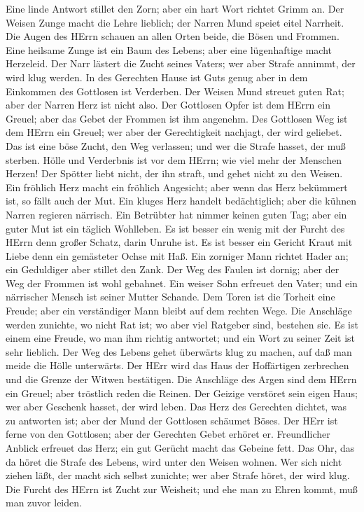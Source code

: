  Eine linde Antwort stillet den Zorn; aber ein hart Wort
richtet Grimm an.  Der Weisen Zunge macht die Lehre
lieblich; der Narren Mund speiet eitel Narrheit.  Die Augen
des HErrn schauen an allen Orten beide, die Bösen und Frommen.
 Eine heilsame Zunge ist ein Baum des Lebens; aber eine
lügenhaftige macht Herzeleid.  Der Narr lästert die Zucht
seines Vaters; wer aber Strafe annimmt, der wird klug werden.
 In des Gerechten Hause ist Guts genug aber in dem Einkommen
des Gottlosen ist Verderben.  Der Weisen Mund streuet guten
Rat; aber der Narren Herz ist nicht also.  Der Gottlosen
Opfer ist dem HErrn ein Greuel; aber das Gebet der Frommen ist ihm
angenehm.  Des Gottlosen Weg ist dem HErrn ein Greuel; wer
aber der Gerechtigkeit nachjagt, der wird geliebet.  Das
ist eine böse Zucht, den Weg verlassen; und wer die Strafe hasset, der
muß sterben.  Hölle und Verderbnis ist vor dem HErrn; wie
viel mehr der Menschen Herzen!  Der Spötter liebt nicht,
der ihn straft, und gehet nicht zu den Weisen.  Ein
fröhlich Herz macht ein fröhlich Angesicht; aber wenn das Herz bekümmert
ist, so fällt auch der Mut.  Ein kluges Herz handelt
bedächtiglich; aber die kühnen Narren regieren närrisch. 
Ein Betrübter hat nimmer keinen guten Tag; aber ein guter Mut ist ein
täglich Wohlleben.  Es ist besser ein wenig mit der Furcht
des HErrn denn großer Schatz, darin Unruhe ist.  Es ist
besser ein Gericht Kraut mit Liebe denn ein gemästeter Ochse mit Haß.
 Ein zorniger Mann richtet Hader an; ein Geduldiger aber
stillet den Zank.  Der Weg des Faulen ist dornig; aber der
Weg der Frommen ist wohl gebahnet.  Ein weiser Sohn
erfreuet den Vater; und ein närrischer Mensch ist seiner Mutter Schande.
 Dem Toren ist die Torheit eine Freude; aber ein
verständiger Mann bleibt auf dem rechten Wege.  Die
Anschläge werden zunichte, wo nicht Rat ist; wo aber viel Ratgeber sind,
bestehen sie.  Es ist einem eine Freude, wo man ihm richtig
antwortet; und ein Wort zu seiner Zeit ist sehr lieblich. 
Der Weg des Lebens gehet überwärts klug zu machen, auf daß man meide die
Hölle unterwärts.  Der HErr wird das Haus der Hoffärtigen
zerbrechen und die Grenze der Witwen bestätigen.  Die
Anschläge des Argen sind dem HErrn ein Greuel; aber tröstlich reden die
Reinen.  Der Geizige verstöret sein eigen Haus; wer aber
Geschenk hasset, der wird leben.  Das Herz des Gerechten
dichtet, was zu antworten ist; aber der Mund der Gottlosen schäumet
Böses.  Der HErr ist ferne von den Gottlosen; aber der
Gerechten Gebet erhöret er.  Freundlicher Anblick erfreuet
das Herz; ein gut Gerücht macht das Gebeine fett.  Das Ohr,
das da höret die Strafe des Lebens, wird unter den Weisen wohnen.
 Wer sich nicht ziehen läßt, der macht sich selbst
zunichte; wer aber Strafe höret, der wird klug.  Die Furcht
des HErrn ist Zucht zur Weisheit; und ehe man zu Ehren kommt, muß man
zuvor leiden.

